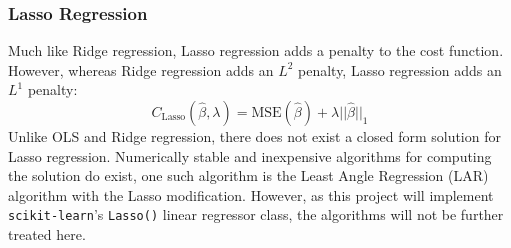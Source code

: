 \documentclass[nofootinbib,reprint,english]{revtex4-1}
\newcommand{\betahat}{\hat{\beta}}
\begin{document}
\subsubsection{Lasso Regression}
Much like Ridge regression, Lasso regression adds a penalty to the cost function. However, whereas Ridge regression adds an \(L^2\) penalty, Lasso regression adds an \(L^1\) penalty:
\begin{equation}
C_\text{Lasso}(\betahat,\lambda)=\text{MSE}(\betahat)+\lambda||\betahat||_1
\end{equation}
Unlike OLS and Ridge regression, there does not exist a closed form solution for Lasso regression. Numerically stable and inexpensive algorithms for computing the solution do exist, one such algorithm is the Least Angle Regression (LAR) algorithm with the Lasso modification. However, as this project will implement \texttt{scikit-learn}'s \texttt{Lasso()} linear regressor class, the algorithms will not be further treated here.
\end{document}
